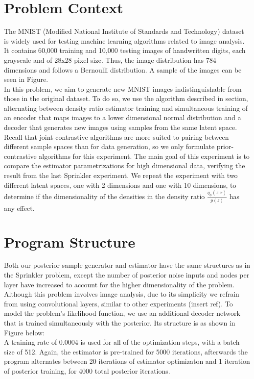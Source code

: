 \documentclass[honours,12pt]{unswthesis}
\numberwithin{equation}{section}
\theoremstyle{definition}
\begin{document}
\section{Problem Context}
The MNIST (Modified National Institute of Standards and Technology) dataset is widely used for testing machine learning algorithms related to image analysis. It contains 60,000 training and 10,000 testing images of handwritten digits, each grayscale and of 28x28 pixel size. Thus, the image distribution has 784 dimensions and follows a Bernoulli distribution. A sample of the images can be seen in Figure.\\
In this problem, we aim to generate new MNIST images indistinguishable from those in the original dataset. To do so, we use the algorithm described in section, alternating between density ratio estimator training and simultaneous training of an encoder that maps images to a lower dimensional normal distribution and a decoder that generates new images using samples from the same latent space.\\
Recall that joint-contrastive algorithms are more suited to pairing between different sample spaces than for data generation, so we only formulate prior-contrastive algorithms for this experiment. The main goal of this experiment is to compare the estimator parametrizations for high dimensional data, verifying the result from the last Sprinkler experiment. We repeat the experiment with two different latent spaces, one with 2 dimensions and one with 10 dimensions, to determine if the dimensionality of the densities in the density ratio $\frac{q_\phi(z|x)}{p(z)}$ has any effect.
\section{Program Structure}
Both our posterior sample generator and estimator have the same structures as in the Sprinkler problem, except the number of posterior noise inputs and nodes per layer have increased to account for the higher dimensionality of the problem. Although this problem involves image analysis, due to its simplicity we refrain from using convolutional layers, similar to other experiments (insert ref). To model the problem's likelihood function, we use an additional decoder network that is trained simultaneously with the posterior. Its structure is as shown in Figure below:\\
A training rate of 0.0004 is used for all of the optimization steps, with a batch size of 512. Again, the estimator is pre-trained for 5000 iterations, afterwards the program alternates between 20 iterations of estimator optimizaton and 1 iteration of posterior training, for 4000 total posterior iterations.
\end{document}
